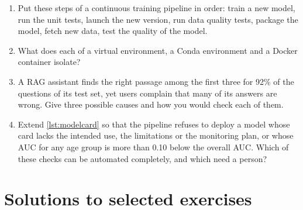\begin{enumerate}[label=\textbf{5.\arabic*},ref=5.\arabic*,leftmargin=*,itemsep=6pt]
  \item\label{exr5:order} Put these steps of a continuous training pipeline in order: train a new model, run the
        unit tests, launch the new version, run data quality tests, package the model, fetch new data, test the
        quality of the model.
  \item\label{exr5:isolation} What does each of a virtual environment, a Conda environment and a Docker container
        isolate?
  \item\label{exr5:rag} A RAG assistant finds the right passage among the first three for 92\% of the questions of
        its test set, yet users complain that many of its answers are wrong. Give three possible causes and how you would
        check each of them.
\item\label{exr5:modelcard} Extend \cref{lst:modelcard} so that the pipeline refuses to deploy a model
whose card lacks the intended use, the limitations or the monitoring plan, or whose AUC for any
age group is more than 0.10 below the overall AUC. Which of these checks can be automated
completely, and which need a person?
\end{enumerate}

\section*{Solutions to selected exercises}

